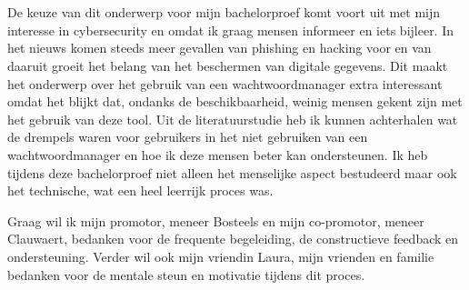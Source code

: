 
\chapter*{}%
\label{ch:voorwoord}


De keuze van dit onderwerp voor mijn bachelorproef komt voort uit met mijn interesse in cybersecurity en omdat ik graag mensen informeer en iets bijleer. In het nieuws komen steeds meer gevallen van phishing en hacking voor en van daaruit groeit het belang van het beschermen van digitale gegevens. Dit maakt het onderwerp over het gebruik van een wachtwoordmanager extra interessant omdat het blijkt dat, ondanks de beschikbaarheid, weinig mensen gekent zijn met het gebruik van deze tool. Uit de literatuurstudie heb ik kunnen achterhalen wat de drempels waren voor gebruikers in het niet gebruiken van een wachtwoordmanager en hoe ik deze mensen beter kan ondersteunen.
Ik heb tijdens deze bachelorproef niet alleen het menselijke aspect bestudeerd maar ook het technische, wat een heel leerrijk proces was. 

Graag wil ik mijn promotor, meneer Bosteels en mijn co-promotor, meneer Clauwaert, bedanken voor de frequente begeleiding, de constructieve feedback en ondersteuning. Verder wil ook mijn vriendin Laura, mijn vrienden en familie bedanken voor de mentale steun en motivatie tijdens dit proces.
